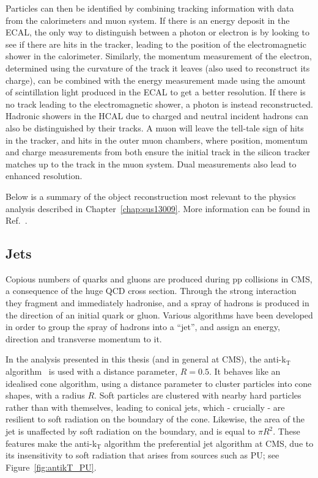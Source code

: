 Particles can then be identified by combining tracking information with data from the calorimeters and muon system.
If there is an energy deposit in the \ac{ECAL}, the only way to distinguish between a photon or electron is by looking to see if there are hits in the tracker, leading to the position of the electromagnetic shower in the calorimeter. 
Similarly, the momentum measurement of the electron, determined using the curvature of the track it leaves (also used to reconstruct its charge), can be combined with the energy measurement made using the amount of scintillation light produced in the \ac{ECAL} to get a better resolution.
If there is no track leading to the electromagnetic shower, a photon is instead reconstructed.
Hadronic showers in the \ac{HCAL} due to charged and neutral incident hadrons can also be distinguished by their tracks.
A muon will leave the tell-tale sign of hits in the tracker, and hits in the outer muon chambers, where position, momentum and charge measurements from both ensure the initial track in the silicon tracker matches up to the track in the muon system. Dual measurements also lead to enhanced resolution.


Below is a summary of the object reconstruction most relevant to the physics analysis described in Chapter~\ref{chap:sus13009}. 
More information can be found in Ref.~\cite{TDRVOL1}.


\subsection{Jets}
Copious numbers of quarks and gluons are produced during pp collisions in \ac{CMS}, a consequence of the huge \ac{QCD} cross section.
Through the strong interaction they fragment and immediately hadronise, and a spray of hadrons is produced in the direction of an initial quark or gluon.
Various algorithms have been developed in order to group the spray of hadrons into a ``jet'', and assign an energy, direction and transverse momentum to it.

In the analysis presented in this thesis (and in general at \ac{CMS}), the anti-k$_{\mathrm{T}}$ algorithm~\cite{bib:akjets} is used with a distance parameter, $R = 0.5$.
It behaves like an idealised cone algorithm, using a distance parameter to cluster particles into cone shapes, with a radius $R$. Soft particles are clustered with nearby hard particles rather than with themselves, leading to conical jets, which - crucially - are resilient to soft radiation on the boundary of the cone.
Likewise, the area of the jet is unaffected by soft radiation on the boundary, and is equal to $\pi R^{2}$. 
These features make the anti-k$_{\mathrm{T}}$ algorithm the preferential jet algorithm at \ac{CMS}, due to its insensitivity to soft radiation that arises from sources such as \ac{PU}; see Figure~\ref{fig:antikT_PU}. 

